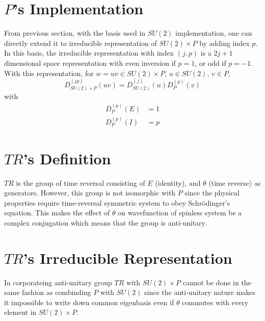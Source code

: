\documentclass[12pt]{revtex4-2}
\begin{document}
\section{$P$'s Implementation}
From previous section, with the basis used in $SU(2)$ implementation, one can directly extend it to irreducible representation of $SU(2)\times P$ by adding index $p$. In this basis, the irreducible representation with index $(j, p)$ is a $2j+1$ dimensional space representation with even inversion if $p=1$, or odd if $p=-1$. With this representation, for $w=uv\in SU(2)\times P$, $u \in SU(2)$, $v\in P$,
\begin{equation}
    D_{SU(2)\times P}^{(jp)}(uv) = D_{SU(2)}^{(j)}(u)D_P^{(p)}(v)
\end{equation}
with
\begin{equation}
    \begin{aligned}
        D_P^{(p)}(E) &= 1 \\
        D_P^{(p)}(I) &= p
    \end{aligned}
\end{equation}

\section{$TR$'s Definition}
$TR$ is the group of time reversal consisting of $E$ (identity), and $\theta$ (time reverse) as generators. However, this group is not isomorphic with $P$ since the physical properties require time-reversal symmetric system to obey Schr\"odinger's equation. This makes the effect of $\theta$ on wavefunction of spinless system be a complex conjugation which means that the group is anti-unitary.

\section{$TR$'s Irreducible Representation}
In corporateing anti-unitary group $TR$ with $SU(2)\times P$ cannot be done in the same fashion as combinding $P$ with $SU(2)$ since the anti-unitary nature makes it impossible to write down common eigenbasis even if $\theta$ commutes with every element in $SU(2)\times P$.
\end{document}
